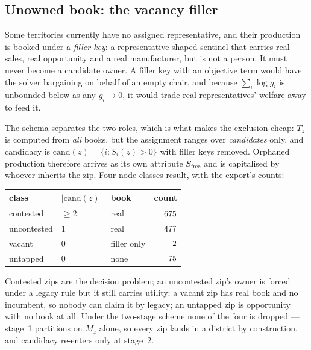 \documentclass[11pt]{article}
\theoremstyle{definition}
\newcommand{\Sfree}{S_{\mathrm{free}}}
\begin{document}
\subsection{Unowned book: the vacancy filler}\label{sec:free}

Some territories currently have no assigned representative, and their production is
booked under a \emph{filler key}: a representative-shaped sentinel that carries real
sales, real opportunity and a real manufacturer, but is not a person. It must never
become a candidate owner. A filler key with an objective term would have the solver
bargaining on behalf of an empty chair, and because $\sum_i\log g_i$ is unbounded below as
any $g_i\to0$, it would trade real representatives' welfare away to feed it.

The schema separates the two roles, which is what makes the exclusion cheap: $T_z$ is
computed from \emph{all} books, but the assignment ranges over \emph{candidates} only,
and candidacy is $\mathrm{cand}(z)=\{i: S_i(z)>0\}$ with filler keys removed. Orphaned
production therefore arrives as its own attribute $\Sfree$ and is capitalised by whoever
inherits the zip. Four node classes result, with the export's counts:

\begin{center}
\small
\begin{tabular}{lllr}
\toprule
class & $|\mathrm{cand}(z)|$ & book & count\\
\midrule
contested & $\ge 2$ & real & $675$\\
uncontested & $1$ & real & $477$\\
vacant & $0$ & filler only & $2$\\
untapped & $0$ & none & $75$\\
\bottomrule
\end{tabular}
\end{center}

Contested zips are the decision problem; an uncontested zip's owner is forced under a
legacy rule but it still carries utility; a vacant zip has real book and no incumbent, so
nobody can claim it by legacy; an untapped zip is opportunity with no book at all. Under
the two-stage scheme none of the four is dropped --- stage~1 partitions on $M_z$ alone, so
every zip lands in a district by construction, and candidacy re-enters only at stage~2.
\end{document}
